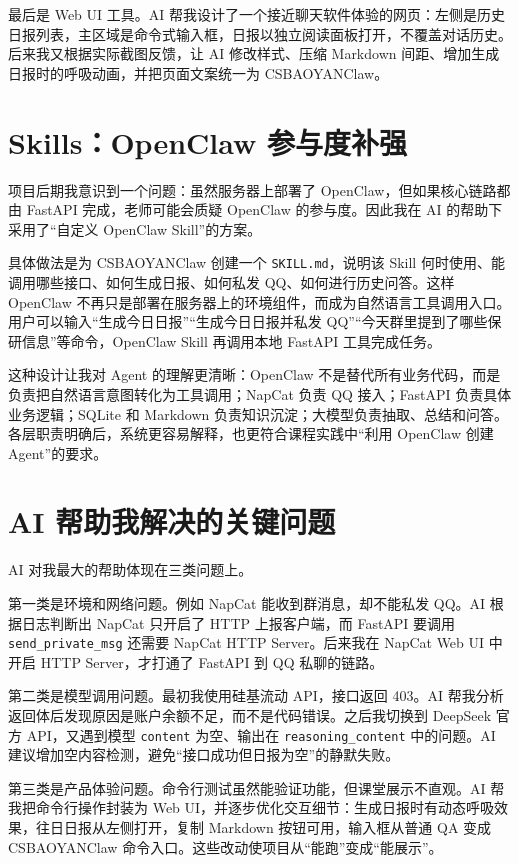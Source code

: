 \documentclass[conference]{IEEEtran}
\begin{document}
最后是 Web UI 工具。AI 帮我设计了一个接近聊天软件体验的网页：左侧是历史日报列表，主区域是命令式输入框，日报以独立阅读面板打开，不覆盖对话历史。后来我又根据实际截图反馈，让 AI 修改样式、压缩 Markdown 间距、增加生成日报时的呼吸动画，并把页面文案统一为 CSBAOYANClaw。

\section{Skills：OpenClaw 参与度补强}

项目后期我意识到一个问题：虽然服务器上部署了 OpenClaw，但如果核心链路都由 FastAPI 完成，老师可能会质疑 OpenClaw 的参与度。因此我在 AI 的帮助下采用了“自定义 OpenClaw Skill”的方案。

具体做法是为 CSBAOYANClaw 创建一个 \texttt{SKILL.md}，说明该 Skill 何时使用、能调用哪些接口、如何生成日报、如何私发 QQ、如何进行历史问答。这样 OpenClaw 不再只是部署在服务器上的环境组件，而成为自然语言工具调用入口。用户可以输入“生成今日日报”“生成今日日报并私发 QQ”“今天群里提到了哪些保研信息”等命令，OpenClaw Skill 再调用本地 FastAPI 工具完成任务。

这种设计让我对 Agent 的理解更清晰：OpenClaw 不是替代所有业务代码，而是负责把自然语言意图转化为工具调用；NapCat 负责 QQ 接入；FastAPI 负责具体业务逻辑；SQLite 和 Markdown 负责知识沉淀；大模型负责抽取、总结和问答。各层职责明确后，系统更容易解释，也更符合课程实践中“利用 OpenClaw 创建 Agent”的要求。

\section{AI 帮助我解决的关键问题}

AI 对我最大的帮助体现在三类问题上。

第一类是环境和网络问题。例如 NapCat 能收到群消息，却不能私发 QQ。AI 根据日志判断出 NapCat 只开启了 HTTP 上报客户端，而 FastAPI 要调用 \texttt{send\_private\_msg} 还需要 NapCat HTTP Server。后来我在 NapCat Web UI 中开启 HTTP Server，才打通了 FastAPI 到 QQ 私聊的链路。

第二类是模型调用问题。最初我使用硅基流动 API，接口返回 403。AI 帮我分析返回体后发现原因是账户余额不足，而不是代码错误。之后我切换到 DeepSeek 官方 API，又遇到模型 \texttt{content} 为空、输出在 \texttt{reasoning\_content} 中的问题。AI 建议增加空内容检测，避免“接口成功但日报为空”的静默失败。

第三类是产品体验问题。命令行测试虽然能验证功能，但课堂展示不直观。AI 帮我把命令行操作封装为 Web UI，并逐步优化交互细节：生成日报时有动态呼吸效果，往日日报从左侧打开，复制 Markdown 按钮可用，输入框从普通 QA 变成 CSBAOYANClaw 命令入口。这些改动使项目从“能跑”变成“能展示”。
\end{document}
